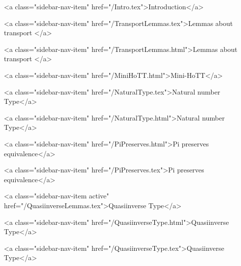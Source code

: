       
    
      
        
          <a class="sidebar-nav-item" href="/Intro.tex">Introduction</a>
        
      
    
      
        
          <a class="sidebar-nav-item" href="/TransportLemmas.tex">Lemmas about transport </a>
        
      
    
      
        
          <a class="sidebar-nav-item" href="/TransportLemmas.html">Lemmas about transport </a>
        
      
    
      
        
          <a class="sidebar-nav-item" href="/MiniHoTT.html">Mini-HoTT</a>
        
      
    
      
        
          <a class="sidebar-nav-item" href="/NaturalType.tex">Natural number Type</a>
        
      
    
      
        
          <a class="sidebar-nav-item" href="/NaturalType.html">Natural number Type</a>
        
      
    
      
        
          <a class="sidebar-nav-item" href="/PiPreserves.html">Pi preserves equivalence</a>
        
      
    
      
        
          <a class="sidebar-nav-item" href="/PiPreserves.tex">Pi preserves equivalence</a>
        
      
    
      
        
          <a class="sidebar-nav-item active" href="/QuasiinverseLemmas.tex">Quasiinverse Type</a>
        
      
    
      
        
          <a class="sidebar-nav-item" href="/QuasiinverseType.html">Quasiinverse Type</a>
        
      
    
      
        
          <a class="sidebar-nav-item" href="/QuasiinverseType.tex">Quasiinverse Type</a>
        
